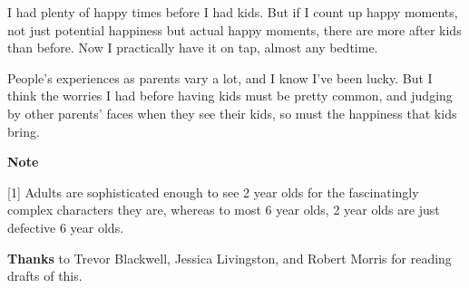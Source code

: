 I had plenty of happy times before I had kids.
                  But if I count up happy moments, not just potential happiness
                  but actual happy moments, there are more after kids than
                  before. Now I practically have it on tap, almost any
                  bedtime.

People's experiences as parents vary a
                  lot, and I know I've been lucky. But I think the worries I had
                  before having kids must be pretty common, and judging by other
                  parents' faces when they see their kids, so must the happiness
                  that kids bring.










                  \textbf{Note}

[1] Adults are sophisticated enough to
                  see 2 year olds for the fascinatingly complex characters they
                  are, whereas to most 6 year olds, 2 year olds are just
                  defective 6 year olds.



\textbf{Thanks} to
                  Trevor Blackwell, Jessica Livingston, and Robert Morris for
                  reading drafts of this.


              
            
          
